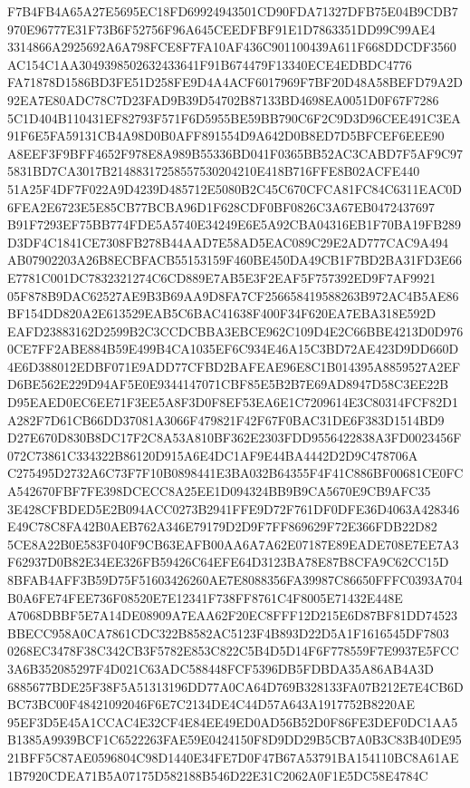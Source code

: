 \documentclass[UTF8,fontset=fandol,zihao=-4,a4paper]{ctexart}
\begin{document}
{{F7B4FB4A65A27E5695EC18FD69924943501CD90FDA71327DFB75E04B9CDB7970E96777E31F73B6F52756F96A645CEEDFBF91E1D7863351DD99C99AE4
3314866A2925692A6A798FCE8F7FA10AF436C901100439A611F668DDCDF3560AC154C1AA3049398502632433641F91B674479F13340ECE4EDBDC4776
FA71878D1586BD3FE51D258FE9D4A4ACF6017969F7BF20D48A58BEFD79A2D92EA7E80ADC78C7D23FAD9B39D54702B87133BD4698EA0051D0F67F7286
5C1D404B110431EF82793F571F6D5955BE59BB790C6F2C9D3D96CEE491C3EA91F6E5FA59131CB4A98D0B0AFF891554D9A642D0B8ED7D5BFCEF6EEE90
A8EEF3F9BFF4652F978E8A989B55336BD041F0365BB52AC3CABD7F5AF9C975831BD7CA3017B21488317258557530204210E418B716FFE8B02ACFE440
51A25F4DF7F022A9D4239D485712E5080B2C45C670CFCA81FC84C6311EAC0D6FEA2E6723E5E85CB77BCBA96D1F628CDF0BF0826C3A67EB0472437697
B91F7293EF75BB774FDE5A5740E34249E6E5A92CBA04316EB1F70BA19FB289D3DF4C1841CE7308FB278B44AAD7E58AD5EAC089C29E2AD777CAC9A494
AB07902203A26B8ECBFACB55153159F460BE450DA49CB1F7BD2BA31FD3E66E7781C001DC7832321274C6CD889E7AB5E3F2EAF5F757392ED9F7AF9921
05F878B9DAC62527AE9B3B69AA9D8FA7CF256658419588263B972AC4B5AE86BF154DD820A2E613529EAB5C6BAC41638F400F34F620EA7EBA318E592D
EAFD23883162D2599B2C3CCDCBBA3EBCE962C109D4E2C66BBE4213D0D9760CE7FF2ABE884B59E499B4CA1035EF6C934E46A15C3BD72AE423D9DD660D
4E6D388012EDBF071E9ADD77CFBD2BAFEAE96E8C1B014395A8859527A2EFD6BE562E229D94AF5E0E9344147071CBF85E5B2B7E69AD8947D58C3EE22B
D95EAED0EC6EE71F3EE5A8F3D0F8EF53EA6E1C7209614E3C80314FCF82D1A282F7D61CB66DD37081A3066F479821F42F67F0BAC31DE6F383D1514BD9
D27E670D830B8DC17F2C8A53A810BF362E2303FDD9556422838A3FD0023456F072C73861C334322B86120D915A6E4DC1AF9E44BA4442D2D9C478706A
C275495D2732A6C73F7F10B0898441E3BA032B64355F4F41C886BF00681CE0FCA542670FBF7FE398DCECC8A25EE1D094324BB9B9CA5670E9CB9AFC35
3E428CFBDED5E2B094ACC0273B2941FFE9D72F761DF0DFE36D4063A428346E49C78C8FA42B0AEB762A346E79179D2D9F7FF869629F72E366FDB22D82
5CE8A22B0E583F040F9CB63EAFB00AA6A7A62E07187E89EADE708E7EE7A3F62937D0B82E34EE326FB59426C64EFE64D3123BA78E87B8CFA9C62CC15D
8BFAB4AFF3B59D75F51603426260AE7E8088356FA39987C86650FFFC0393A704B0A6FE74FEE736F08520E7E12341F738FF8761C4F8005E71432E448E
A7068DBBF5E7A14DE08909A7EAA62F20EC8FFF12D215E6D87BF81DD74523BBECC958A0CA7861CDC322B8582AC5123F4B893D22D5A1F1616545DF7803
0268EC3478F38C342CB3F5782E853C822C5B4D5D14F6F778559F7E9937E5FCC3A6B352085297F4D021C63ADC588448FCF5396DB5FDBDA35A86AB4A3D
6885677BDE25F38F5A51313196DD77A0CA64D769B328133FA07B212E7E4CB6DBC73BC00F48421092046F6E7C2134DE4C44D57A643A1917752B8220AE
95EF3D5E45A1CCAC4E32CF4E84EE49ED0AD56B52D0F86FE3DEF0DC1AA5B1385A9939BCF1C6522263FAE59E0424150F8D9DD29B5CB7A0B3C83B40DE95
21BFF5C87AE0596804C98D1440E34FE7D0F47B67A53791BA154110BC8A61AE1B7920CDEA71B5A07175D582188B546D22E31C2062A0F1E5DC58E4784C
}}
\end{document}
